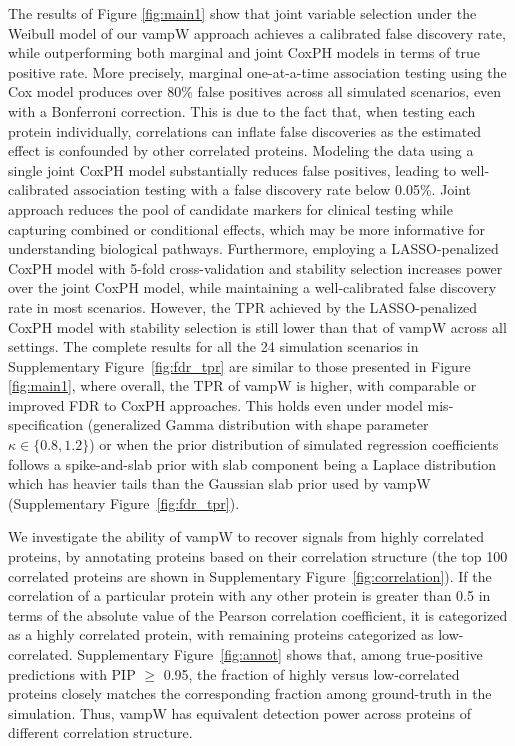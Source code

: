 The results of Figure \ref{fig:main1} show that joint variable selection under the Weibull model of our vampW approach achieves a calibrated false discovery rate, while outperforming both marginal and joint CoxPH models in terms of true positive rate. More precisely, marginal one-at-a-time association testing using the Cox model produces over 80\% false positives across all simulated scenarios, even with a Bonferroni correction. This is due to the fact that, when testing each protein individually, correlations can inflate false discoveries as the estimated effect is confounded by other correlated proteins. Modeling the data using a single joint CoxPH model substantially reduces false positives, leading to well-calibrated association testing with a false discovery rate below 0.05\%. Joint approach reduces the pool of candidate markers for clinical testing while capturing combined or conditional effects, which may be more informative for understanding biological pathways. Furthermore, employing a LASSO-penalized CoxPH model with 5-fold cross-validation and stability selection increases power over the joint CoxPH model, while maintaining a well-calibrated false discovery rate in most scenarios. However, the TPR achieved by the LASSO-penalized CoxPH model with stability selection is still lower than that of vampW across all settings. The complete results for all the 24 simulation scenarios in Supplementary  Figure~\ref{fig:fdr_tpr} are similar to those presented in Figure \ref{fig:main1}, where overall, the TPR of vampW is higher, with comparable or improved FDR to CoxPH approaches. This holds even under model mis-specification (generalized Gamma distribution with shape parameter $\kappa \in \{0.8, 1.2\}$) or when the prior distribution of simulated regression coefficients follows a spike-and-slab prior with slab component being a Laplace distribution which has heavier tails than the Gaussian slab prior used by vampW (Supplementary Figure~\ref{fig:fdr_tpr}). 
 
We investigate the ability of vampW to recover signals from highly correlated proteins, by annotating proteins based on their correlation structure (the top 100 correlated proteins are shown in Supplementary Figure~\ref{fig:correlation}). If the correlation of a particular protein with any other protein is greater than 0.5 in terms of the absolute value of the Pearson correlation coefficient, it is categorized as a highly correlated protein, with remaining proteins categorized as low-correlated. Supplementary Figure~\ref{fig:annot} shows that, among true-positive predictions with PIP $\geq$ 0.95, the fraction of highly versus low-correlated proteins closely matches the corresponding fraction among ground-truth in the simulation. Thus, vampW has equivalent detection power across proteins of different correlation structure.

